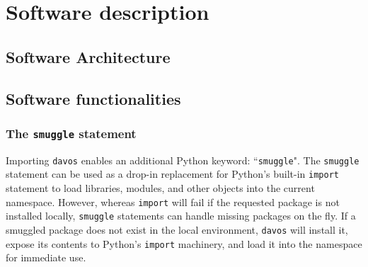 \documentclass[preprint,12pt, a4paper]{elsarticle}
\begin{document}






\section{Software description}


\subsection{Software Architecture}


\subsection{Software functionalities}%

\subsubsection{The \texttt{smuggle} statement}
Importing \texttt{davos} enables an additional Python keyword: ``\texttt{smuggle}".
The \texttt{smuggle} statement can be used as a drop-in replacement for Python's built-in \texttt{import} statement to load libraries, modules, and other objects into the current namespace.
However, whereas \texttt{import} will fail if the requested package is not installed locally, \texttt{smuggle} statements can handle missing packages on the fly.
If a smuggled package does not exist in the local environment, \texttt{davos} will install it, expose its contents to Python's \texttt{import} machinery, and load it into the namespace for immediate use.
\end{document}
